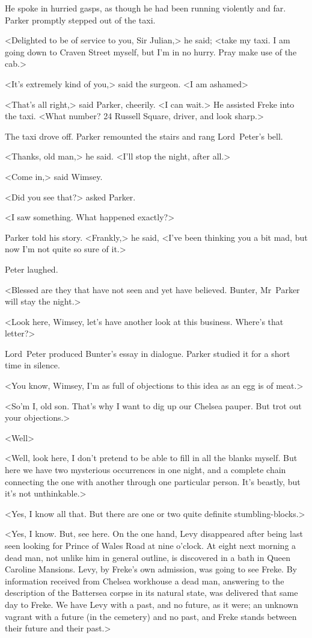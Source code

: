 He spoke in hurried gasps, as though he had been running violently and far. Parker promptly stepped out of the taxi.

<Delighted to be of service to you, Sir Julian,> he said; <take my taxi. I am going down to Craven Street myself, but I'm in no hurry. Pray make use of the cab.>

<It's extremely kind of you,> said the surgeon. <I am ashamed\longdash>

<That's all right,> said Parker, cheerily. <I can wait.> He assisted Freke into the taxi. <What number? 24 Russell Square, driver, and look sharp.>

The taxi drove off. Parker remounted the stairs and rang Lord~Peter's bell.

<Thanks, old man,> he said. <I'll stop the night, after all.>

<Come in,> said Wimsey.

<Did you see that?> asked Parker.

<I saw something. What happened exactly?>

Parker told his story. <Frankly,> he said, <I've been thinking you a bit mad, but now I'm not quite so sure of it.>

Peter laughed.

<Blessed are they that have not seen and yet have believed. Bunter, Mr~Parker will stay the night.>

<Look here, Wimsey, let's have another look at this business. Where's that letter?>

Lord~Peter produced Bunter's essay in dialogue. Parker studied it for a short time in silence.

<You know, Wimsey, I'm as full of objections to this idea as an egg is of meat.>

<So'm I\@, old son. That's why I want to dig up our Chelsea pauper. But trot out your objections.>

<Well\longdash>

<Well, look here, I don't pretend to be able to fill in all the blanks myself. But here we have two mysterious occurrences in one night, and a complete chain connecting the one with another through one particular person. It's beastly, but it's not unthinkable.>

<Yes, I know all that. But there are one or two quite definite stumbling-blocks.>

<Yes, I know. But, see here. On the one hand, Levy disappeared after being last seen looking for Prince of Wales Road at nine o'clock. At eight next morning a dead man, not unlike him in general outline, is discovered in a bath in Queen Caroline Mansions. Levy, by Freke's own admission, was going to see Freke. By information received from Chelsea workhouse a dead man, answering to the description of the Battersea corpse in its natural state, was delivered that same day to Freke. We have Levy with a past, and no future, as it were; an unknown vagrant with a future (in the cemetery) and no past, and Freke stands between their future and their past.>

